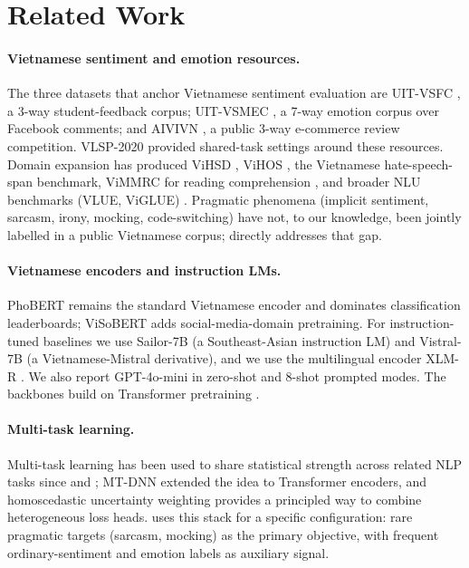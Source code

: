 \section{Related Work}

\paragraph{Vietnamese sentiment and emotion resources.}
The three datasets that anchor Vietnamese sentiment evaluation are
UIT-VSFC \citep{vannguyen2018uitvsfc}, a 3-way student-feedback
corpus; UIT-VSMEC \citep{ho2020uitvsmec}, a 7-way emotion corpus over
Facebook comments; and AIVIVN \citep{aivivn2019}, a public 3-way
e-commerce review competition. VLSP-2020 \citep{vlsp2020sentiment}
provided shared-task settings around these resources. Domain
expansion has produced ViHSD \citep{vihsd2021},
ViHOS \citep{vihos2023}, the Vietnamese hate-speech-span benchmark,
ViMMRC for reading comprehension \citep{nguyen2020vimmrc}, and broader
NLU benchmarks (VLUE, ViGLUE)
\citep{vlue2024,viglue2024}. Pragmatic phenomena (implicit sentiment,
sarcasm, irony, mocking, code-switching) have not, to our knowledge,
been jointly labelled in a public Vietnamese corpus; \method{}
directly addresses that gap.

\paragraph{Vietnamese encoders and instruction LMs.}
PhoBERT \citep{phobert2020} remains the standard Vietnamese encoder
and dominates classification leaderboards;
ViSoBERT \citep{visobert2023} adds social-media-domain pretraining.
For instruction-tuned baselines we use Sailor-7B \citep{sailor2024}
(a Southeast-Asian instruction LM) and Vistral-7B \citep{vistral2024}
(a Vietnamese-Mistral derivative), and we use the multilingual encoder
XLM-R \citep{conneau2020xlmr}. We also report GPT-4o-mini
\citep{openai2024gpt4o} in zero-shot and 8-shot prompted modes. The
backbones build on Transformer pretraining
\citep{devlin2019bert,liu2019roberta,jiang2023mistral,touvron2023llama2}.

\paragraph{Multi-task learning.}
Multi-task learning has been used to share statistical strength
across related NLP tasks since \citet{caruana1997mtl} and
\citet{collobert2008nlpscratch}; MT-DNN \citep{liu2019mtdnn} extended
the idea to Transformer encoders, and homoscedastic uncertainty
weighting \citep{kendall2018uncertainty} provides a principled way to
combine heterogeneous loss heads. \method{} uses this stack for a
specific configuration: rare pragmatic targets (sarcasm, mocking) as
the primary objective, with frequent ordinary-sentiment and emotion
labels as auxiliary signal.

